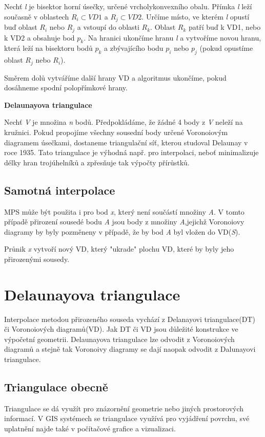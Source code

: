 \documentclass[12pt,a4paper]{article}
\begin{document}
Nechť \textit{l} je bisektor horní úsečky, určené vrcholykonvexního obalu. Přímka \textit{l} leží současně v oblastech $R_i \subset VD1$ a $R_j \subset VD2$. Určíme místo, ve kterém \textit{l} opustí buď oblast $R_i$ nebo $R_j$  a vstoupí do oblasti $R_k$. Oblast $R_k$ patří buď k VD1, nebo k VD2 a obsahuje bod $p_k$. Na hranici ukončíme hranu \textit{l} a vytvoříme novou hranu, která leží na bisektoru bodů $p_k$ a zbývajícího bodu $p_i$ nebo $p_j$ (pokud opustíme oblast $R_j$ nebo $R_i$). 

Směrem dolů vytváříme další hrany VD a algoritmus ukončíme, pokud dosáhneme spodní polopřímkové hrany.

\textbf{Delaunayova triangulace}

Nechť \textit{V} je množina \textit{n} bodů. Předpokládáme, že žádné 4 body z \textit{V} neleží na kružnici. Pokud propojíme všechny sousední body určené Voronoiovým diagramem úsečkami, dostaneme triangulační síť, kterou studoval Delaunay v roce 1935. Tato triangulace je výhodná např. pro interpolaci, neboť minimalizuje délky hran trojúhelníků a zpřesňuje tak výpočty přírůstků. 

\subsection{Samotná interpolace}
MPS může být použita i pro bod \textit{x}, který není součástí množiny \textit{A}. V tomto případě přirození sousedé bodu \textit{A} jsou body z množiny \textit{A},jejichž Voronoiovy diagramy by byly pozměneny v případě, že by bod \textit{A} byl vložen do VD(\textit{S}).

Průnik \textit{x} vytvoří nový VD, který "ukrade" plochu VD, které by byly jeho přirozenými sousedy. 

\newpage
\section{Delaunayova triangulace}
Interpolace metodou přirozeného souseda vychází z Delanayovi triangulace(DT) či Voronoiových diagramů(VD). Jak DT či VD jsou důležité konstrukce ve výpočetní geometrii. Delaunayova triangulace lze odvodit z Voronoiových diagramů a stejně tak Voronoivy diagramy se dají naopak odvodit z Dalunayovi triangulace.

\subsection{Triangulace obecně}
Triangulace se dá využít pro znázornění geometrie nebo jiných prostorových informací. V GIS systémech se triangulace využívá pro vyjádření povrchu, své uplatnění najde také v počítačové grafice a vizualizaci.
\end{document}
